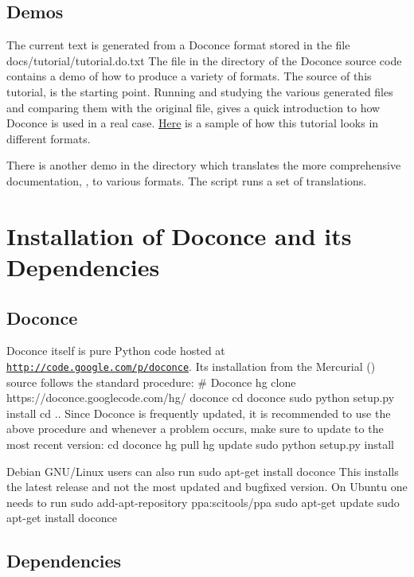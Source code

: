 \documentclass[%
oneside,                 %
final,                   %
chapterprefix=true,      %
open=right               %
10pt]{book}
\begin{document}
\subsection{Demos}

The current text is generated from a Doconce format stored in the file
\bccq
docs/tutorial/tutorial.do.txt
\eccq
The file  in the  directory of the
Doconce source code contains a demo of how to produce a variety of
formats.  The source of this tutorial,  is the
starting point.  Running  and studying the various generated
files and comparing them with the original  file,
gives a quick introduction to how Doconce is used in a real case.
\href{{https://doconce.googlecode.com/hg/doc/demos/tutorial/index.html}}{Here}
is a sample of how this tutorial looks in different formats.

There is another demo in the  directory which
translates the more comprehensive documentation, , to
various formats. The  script runs a set of translations.


\section{Installation of Doconce and its Dependencies}

\subsection{Doconce}

Doconce itself is pure Python code hosted at \href{{http://code.google.com/p/doconce}}{\nolinkurl{http://code.google.com/p/doconce}}.  Its installation from the
Mercurial () source follows the standard procedure:
\bsys
# Doconce
hg clone https://doconce.googlecode.com/hg/ doconce
cd doconce
sudo python setup.py install
cd ..
\esys
Since Doconce is frequently updated, it is recommended to use the
above procedure and whenever a problem occurs, make sure to
update to the most recent version:
\bsys
cd doconce
hg pull
hg update
sudo python setup.py install
\esys

Debian GNU/Linux users can also run
\bsys
sudo apt-get install doconce
\esys
This installs the latest release and not the most updated and bugfixed
version.
On Ubuntu one needs to run
\bsys
sudo add-apt-repository ppa:scitools/ppa
sudo apt-get update
sudo apt-get install doconce
\esys

\subsection{Dependencies}
\end{document}
